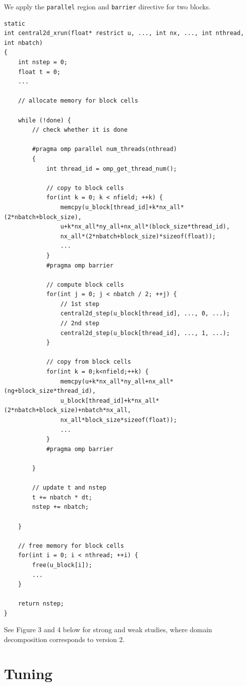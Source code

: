 \documentclass[12pt]{article}
\numberwithin{equation}{section}
\begin{document}
We apply the \texttt{parallel} region and \texttt{barrier} directive for two blocks.

\scriptsize
\begin{lstlisting}
static
int central2d_xrun(float* restrict u, ..., int nx, ..., int nthread, int nbatch)
{
    int nstep = 0;
    float t = 0;
    ...

    // allocate memory for block cells

    while (!done) {
        // check whether it is done

        #pragma omp parallel num_threads(nthread)
        {
            int thread_id = omp_get_thread_num();

            // copy to block cells
            for(int k = 0; k < nfield; ++k) {
                memcpy(u_block[thread_id]+k*nx_all*(2*nbatch+block_size),
                u+k*nx_all*ny_all+nx_all*(block_size*thread_id),
                nx_all*(2*nbatch+block_size)*sizeof(float));
                ...
            }
            #pragma omp barrier

            // compute block cells
            for(int j = 0; j < nbatch / 2; ++j) {
                // 1st step
                central2d_step(u_block[thread_id], ..., 0, ...);
                // 2nd step
                central2d_step(u_block[thread_id], ..., 1, ...);
            }

            // copy from block cells
            for(int k = 0;k<nfield;++k) {
                memcpy(u+k*nx_all*ny_all+nx_all*(ng+block_size*thread_id),
                u_block[thread_id]+k*nx_all*(2*nbatch+block_size)+nbatch*nx_all,
                nx_all*block_size*sizeof(float));
                ...
            }
            #pragma omp barrier

        }

        // update t and nstep
        t += nbatch * dt;
        nstep += nbatch;

    }

    // free memory for block cells
    for(int i = 0; i < nthread; ++i) {
        free(u_block[i]);
        ...
    }

    return nstep;
}
\end{lstlisting}
\normalsize
See Figure 3 and 4 below for strong and weak studies, where domain decomposition corresponds to version 2.





\section{Tuning}
\end{document}
